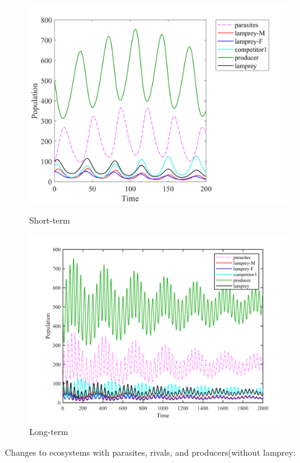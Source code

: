 \documentclass[12pt]{article}  %
\begin{document}
\begin{figure}[htbp]
	\begin{minipage}[b]{0.5\linewidth}
		\centering
		\includegraphics[width=\linewidth]{img/five.png}
		\caption{Short-term}
	\end{minipage}%
	\begin{minipage}[b]{0.5\linewidth}
		\centering
		\includegraphics[width=\linewidth]{img/lamprey-17071240598592.png}
		\caption{Long-term}
	\end{minipage}
\end{figure}
 Changes to ecosystems with parasites, rivals, and producers(without lamprey:
\end{document}
